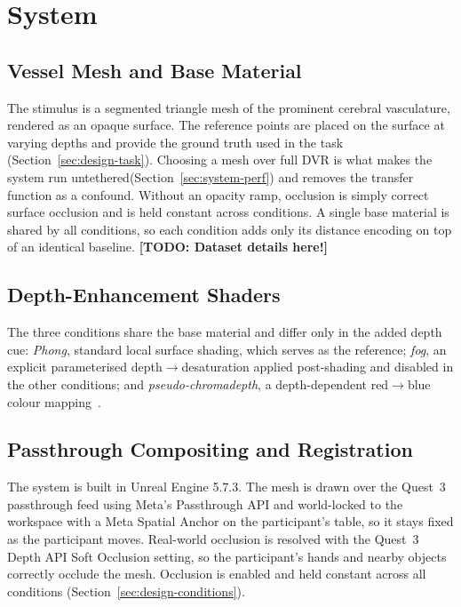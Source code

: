 \documentclass[runningheads]{llncs}
\begin{document}
\section{System}\label{sec:system}

\subsection{Vessel Mesh and Base Material}\label{sec:system-mesh}
The stimulus is a segmented triangle mesh of the prominent cerebral vasculature, rendered as an opaque surface. The reference points are placed on the surface at varying depths and provide the ground truth used in the task (Section~\ref{sec:design-task}). Choosing a mesh over full DVR is what makes the system run untethered(Section~\ref{sec:system-perf}) and removes the transfer function as a confound. Without an opacity ramp, occlusion is simply correct surface occlusion and is held constant across conditions. A single base material is shared by all conditions, so each condition adds only its distance encoding on top of an identical baseline. \textbf{[TODO: Dataset details here!]}

\subsection{Depth-Enhancement Shaders}\label{sec:system-shaders}
The three conditions share the base material and differ only in the added depth cue: \emph{Phong}, standard local surface shading, which serves as the reference; \emph{fog}, an explicit parameterised depth$\rightarrow$desaturation applied post-shading and disabled in the other conditions; and \emph{pseudo-chromadepth}, a depth-dependent red$\rightarrow$blue colour mapping~\cite{ropinski_visually_2006,behrendt_combining_2017}.

\subsection{Passthrough Compositing and Registration}\label{sec:system-passthrough}
The system is built in Unreal Engine 5.7.3. The mesh is drawn over the Quest~3 passthrough feed using Meta's Passthrough API and world-locked to the workspace with a Meta Spatial Anchor on the participant's table, so it stays fixed as the participant moves. Real-world occlusion is resolved with the Quest~3 Depth API Soft Occlusion setting, so the participant's hands and nearby objects correctly occlude the mesh. Occlusion is enabled and held constant across all conditions (Section~\ref{sec:design-conditions}).
\end{document}
